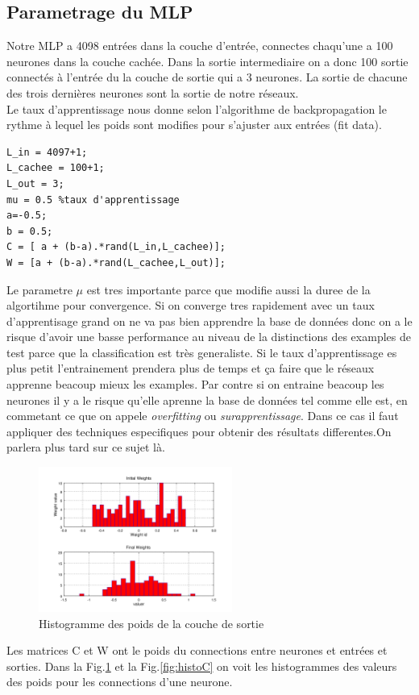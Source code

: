 \documentclass[journal]{IEEEtran}
\begin{document}
\subsection{Parametrage du MLP}

Notre MLP a 4098 entrées dans la couche d'entrée, connectes chaqu'une a 100 neurones dans la couche cachée. 
Dans la sortie intermediaire on a donc 100 sortie connectés à l'entrée du la couche de sortie qui a 3 neurones. La sortie de chacune des trois dernières neurones sont la sortie de notre réseaux.\\
Le taux d'apprentissage nous donne selon l'algorithme de backpropagation le rythme à lequel les poids sont
modifies pour s'ajuster aux entrées (fit data).

\begin{lstlisting}
L_in = 4097+1;
L_cachee = 100+1;
L_out = 3;
mu = 0.5 %taux d'apprentissage
a=-0.5;
b = 0.5;
C = [ a + (b-a).*rand(L_in,L_cachee)];
W = [a + (b-a).*rand(L_cachee,L_out)];
\end{lstlisting}
 Le  parametre $\mu$ est tres importante parce que modifie aussi 
la duree de la algortihme pour convergence. Si on converge tres rapidement avec un taux d'apprentisage grand
on ne va pas  bien apprendre la base de données donc on a le risque d'avoir une basse performance au niveau 
de la distinctions des examples de test parce que la classification est très
generaliste. Si le taux d'apprentissage es plus petit l'entrainement prendera plus
de temps et ça faire que le réseaux apprenne
beacoup mieux les examples. Par contre si on entraine beacoup les neurones il y a
le risque qu'elle aprenne 
la base de données tel comme elle est, en commetant ce que on appele
\textit{overfitting} ou \textit{surapprentissage}. Dans ce cas il faut appliquer
des techniques especifiques pour obtenir des résultats differentes.On parlera plus
tard sur ce sujet là.\\
\begin{figure}[h]
	\centering
	\includegraphics[width=2.5in]{../OctaveNeurons/rs3}
	\caption{Histogramme des poids de la couche de sortie }
	\label{fig:histoW}
\end{figure}
Les matrices C et W ont le poids du connections entre neurones et entrées et
sorties. Dans la Fig.\ref{fig:histoW} et la Fig.\ref{fig:histoC} on voit les 
histogrammes des valeurs des poids pour les connections d'une neurone.
\end{document}
